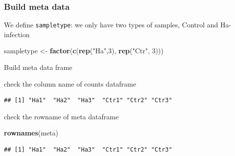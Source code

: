 \documentclass[
]{article}
\newenvironment{Shaded}{\begin{snugshade}}{\end{snugshade}}
\newcommand{\AttributeTok}[1]{\textcolor[rgb]{0.13,0.29,0.53}{#1}}
\newcommand{\DecValTok}[1]{\textcolor[rgb]{0.00,0.00,0.81}{#1}}
\newcommand{\FunctionTok}[1]{\textcolor[rgb]{0.13,0.29,0.53}{\textbf{#1}}}
\newcommand{\NormalTok}[1]{#1}
\newcommand{\OtherTok}[1]{\textcolor[rgb]{0.56,0.35,0.01}{#1}}
\newcommand{\SpecialCharTok}[1]{\textcolor[rgb]{0.81,0.36,0.00}{\textbf{#1}}}
\newcommand{\StringTok}[1]{\textcolor[rgb]{0.31,0.60,0.02}{#1}}
\begin{document}
\subsubsection{Build meta data}\label{build-meta-data}

We define \texttt{sampletype}: we only have two types of samples,
Control and Ha-infection

\begin{Shaded}
\begin{Highlighting}[]
\NormalTok{sampletype }\OtherTok{\textless{}{-}} \FunctionTok{factor}\NormalTok{(}\FunctionTok{c}\NormalTok{(}\FunctionTok{rep}\NormalTok{(}\StringTok{"Ha"}\NormalTok{,}\DecValTok{3}\NormalTok{), }\FunctionTok{rep}\NormalTok{(}\StringTok{"Ctr"}\NormalTok{, }\DecValTok{3}\NormalTok{)))}
\end{Highlighting}
\end{Shaded}

Build meta data frame

\begin{Shaded}
\end{Shaded}

check the column name of counts dataframe

\begin{Shaded}
\end{Shaded}

\begin{verbatim}
## [1] "Ha1"  "Ha2"  "Ha3"  "Ctr1" "Ctr2" "Ctr3"
\end{verbatim}

check the rowname of meta dataframe

\begin{Shaded}
\begin{Highlighting}[]
\FunctionTok{rownames}\NormalTok{(meta)}
\end{Highlighting}
\end{Shaded}

\begin{verbatim}
## [1] "Ha1"  "Ha2"  "Ha3"  "Ctr1" "Ctr2" "Ctr3"
\end{verbatim}
\end{document}
